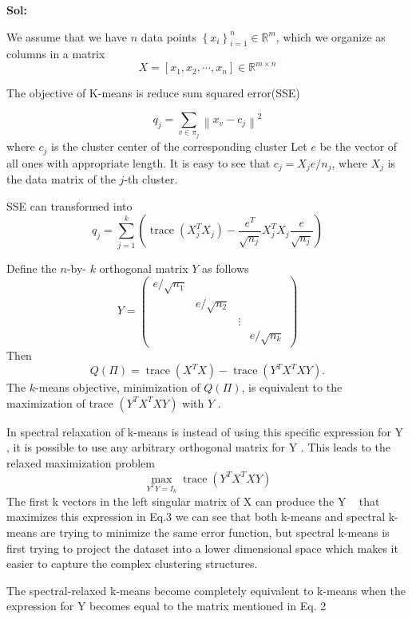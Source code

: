 \documentclass[11pt]{article}
\begin{document}
\textbf{Sol:}

We assume that we have $n$ data points $\left\{x_i\right\}_{i=1}^n \in \mathbb{R}^m$, which we organize as columns in a matrix
$$
X=\left[x_1, x_2, \cdots, x_n\right] \in \mathbb{R}^{m \times n}
$$


The objective of K-means is reduce sum squared error(SSE)

\begin{equation}
	q_j=\sum_{v \in \pi_j}\left\|x_v-c_j\right\|^2
\end{equation}
where $c_j$ is the cluster center of the corresponding cluster
Let $e$ be the vector of all ones with appropriate length. It is easy to see that $c_j=X_j e / n_j$, where $X_j$ is the data matrix of the $j$-th cluster.

SSE can transformed into
\begin{equation}
	q_j=\sum_{j=1}^k\left(\operatorname{trace}\left(X_j^T X_j\right)-\frac{e^T}{\sqrt{n_j}} X_j^T X_j \frac{e}{\sqrt{n_j}}\right)
\end{equation}

Define the $n$-by- $k$ orthogonal matrix $Y$ as follows
$$
Y=\left(\begin{array}{cccc}
	e / \sqrt{n_1} & & \\
	& e / \sqrt{n_2} & \\
	& & \vdots & \\
	& & & e / \sqrt{n_k}
\end{array}\right)
$$
Then
$$
Q(\Pi)=\operatorname{trace}\left(X^T X\right)-\operatorname{trace}\left(Y^T X^T X Y\right) .
$$
The $k$-means objective, minimization of $Q(\Pi)$, is equivalent to the maximization of trace $\left(Y^T X^T X Y\right)$ with $Y$ .

In  spectral
relaxation of k-means is instead of using this specific expression for Y , it is
possible to use any arbitrary orthogonal matrix for Y . This leads to the relaxed maximization problem
\begin{equation}
	\max _{Y^T Y=I_k} \operatorname{trace}\left(Y^T X^T X Y\right)
\end{equation}
The first k vectors in the left singular matrix of X can produce the Y   that maximizes this expression in Eq.3
we can see that both k-means and spectral k-means are trying to minimize the same error function, but spectral k-means is  first trying to project the dataset into a lower dimensional space which makes it easier to capture the complex clustering structures.

The spectral-relaxed k-means become completely equivalent to k-means when the expression for Y becomes
equal to the matrix mentioned in Eq. 2
\end{document}

